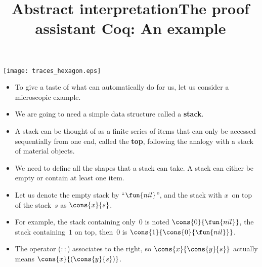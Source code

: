 \documentclass[wide]{slides}
\begin{document}
\begin{slide}
  \title{Abstract interpretation}

  \begin{center}
    \texttt{[image: traces\_hexagon.eps]}
  \end{center}

\end{slide}

\begin{slide}
  \title{The proof assistant Coq: An example}

  \begin{itemize}

    \item To give a taste of what can \Coq automatically do for us,
      let us consider a microscopic example.

    \item We are going to need a simple data structure called a
      \textbf{stack}.

    \item A stack can be thought of as a finite series of items that
      can only be accessed sequentially from one end, called the
      \textbf{top}, following the analogy with a stack of material
      objects.

    \item We need to define all the shapes that a stack can take. A
      stack can either be empty or contain at least one item.

    \item Let us denote the empty stack by ``\(\fun{nil}\)'', and the
      stack with \(x\)~on top of the stack~\(s\) as \(\cons{x}{s}\).

    \item For example, the stack containing only~\(0\) is noted
      \(\cons{0}{\fun{nil}}\), the stack containing~\(1\) on top,
      then~\(0\) is \(\cons{1}{\cons{0}{\fun{nil}}}\).

    \item The operator (\(::\)) associates to the right, so
      \(\cons{x}{\cons{y}{s}}\) actually means
      \(\cons{x}{(\cons{y}{s})}\).

  \end{itemize}
\end{slide}
\end{document}
